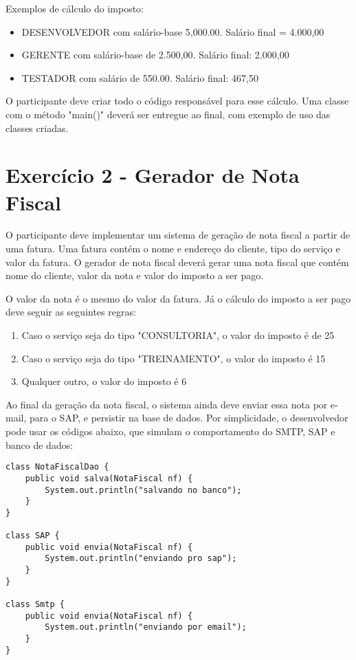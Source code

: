 Exemplos de cálculo do imposto:

\begin{itemize}
	\item DESENVOLVEDOR com salário-base 5,000.00. Salário final = 4.000,00
	\item GERENTE com salário-base de 2.500,00. Salário final: 2.000,00
	\item TESTADOR com salário de 550.00. Salário final: 467,50
\end{itemize}


O participante deve criar todo o código responsável para esse cálculo. Uma classe com
o método "main()" deverá ser entregue ao final, com exemplo de uso das classes criadas.

\section{Exercício 2 - Gerador de Nota Fiscal}

O participante deve implementar um sistema de geração de nota fiscal a partir de uma fatura. 
Uma fatura contém o nome e endereço do cliente, tipo do serviço e valor da fatura. O gerador de
nota fiscal deverá gerar uma nota fiscal que contém nome do cliente, valor da nota e valor
do imposto a ser pago.

O valor da nota é o mesmo do valor da fatura. Já o cálculo do imposto a ser pago deve seguir
as seguintes regras:

\begin{enumerate}
	\item Caso o serviço seja do tipo "CONSULTORIA", o valor do imposto é de 25%
	\item Caso o serviço seja do tipo "TREINAMENTO", o valor do imposto é 15%
	\item Qualquer outro, o valor do imposto é 6%
\end{enumerate}

Ao final da geração da nota fiscal, o sistema ainda deve enviar essa nota por e-mail,
para o SAP, e persistir na base de dados. Por simplicidade, o desenvolvedor pode usar
os códigos abaixo, que simulam o comportamento do SMTP, SAP e banco de dados:

\begin{lstlisting}
class NotaFiscalDao {
	public void salva(NotaFiscal nf) { 
		System.out.println("salvando no banco"); 
	}
}

class SAP {
	public void envia(NotaFiscal nf) { 
		System.out.println("enviando pro sap"); 
	}
}

class Smtp {
	public void envia(NotaFiscal nf) { 
		System.out.println("enviando por email"); 
	}
}
\end{lstlisting}


